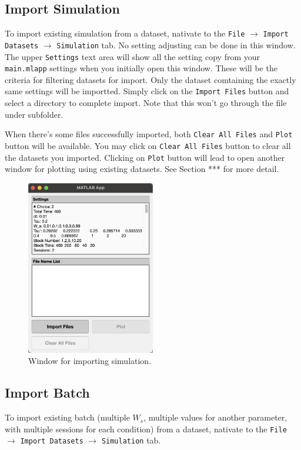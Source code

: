 \subsection{Import Simulation} \label{sec:import_sim}

To import existing simulation from a dataset, nativate to the \texttt{File} $\rightarrow$ \texttt{Import Datasets} $\rightarrow$ \texttt{Simulation} tab. No setting adjusting can be done in this window. The upper \texttt{Settings} text area will show all the setting copy from your \texttt{main.mlapp} settings when you initially open this window. These will be the criteria for filtering datasets for import. Only the dataset comtaining the exactly same settings will be importted. Simply click on the \texttt{Import Files} button and select a directory to complete import. Note that this won't go through the file under subfolder.

When there's some files successfully imported, both \texttt{Clear All Files} and \texttt{Plot} button will be available. You may click on \texttt{Clear All Files} button to clear all the datasets you imported. Clicking on \texttt{Plot} button will lead to open another window for plotting using existing datasets. See Section *** for more detail.

\begin{figure}[H]
    \centering
    \includegraphics[width=0.5\textwidth]{figs/import_sim.png}
    \caption{Window for importing simulation.}
    \label{fig:import_sim}
\end{figure}

\subsection{Import Batch}
To import existing batch (multiple $W_s$, multiple values for another parameter, with multiple sessions for each condition) from a dataset, nativate to the \texttt{File} $\rightarrow$ \texttt{Import Datasets} $\rightarrow$ \texttt{Simulation} tab.

